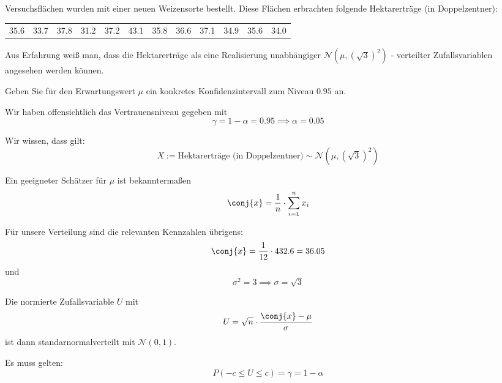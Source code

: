 \documentclass{abgabe}
\begin{document}
\begin{questions}
     Versuchsflächen wurden mit einer neuen Weizensorte bestellt.
    Diese Flächen erbrachten folgende Hektarerträge (in Doppelzentner):
    
    \begin{center}
        \begin{tabular}{cccccccccccc}
            35.6 & 33.7 & 37.8 & 31.2 & 37.2 & 43.1 & 35.8 & 36.6 & 37.1 & 34.9 & 35.6 & 34.0
        \end{tabular}
    \end{center}
    
    Aus Erfahrung weiß man, dass die Hektarerträge als eine Realisierung unabhängiger $\mathcal{N}(\mu, (\sqrt{3})^2)$ - verteilter Zufallsvariablen angesehen werden können. 
    
    Geben Sie für den Erwartungswert $\mu$ ein konkretes Konfidenzintervall zum Niveau $0.95$ an.
    
    \begin{solution}
        Wir haben offensichtlich das Vertrauensniveau gegeben mit 
        \[
            \gamma = 1 - \alpha = 0.95 \implies \alpha = 0.05    
        \]
        
        Wir wissen, dass gilt:
        \[ 
            X := \text{Hektarerträge (in Doppelzentner)} \sim \mathcal{N}(\mu, (\sqrt{3})^2)
        \]
        
        Ein geeigneter Schätzer für $\mu$ ist bekanntermaßen 
        \[
            \conj{x} = \frac{1}{n} \cdot \sum_{i=1}^{n} x_i    
        \]
        
        Für unsere Verteilung sind die relevanten Kennzahlen übrigens: 
        \[ 
            \conj{x} = \frac{1}{12} \cdot 432.6 = 36.05
        \]
        und 
        \[ 
            \sigma^2 = 3 \implies \sigma = \sqrt{3}
        \]
        
        Die normierte Zufallsvariable $U$ mit 
        \[ 
            U = \sqrt{n} \cdot \frac{\conj{x} - \mu}{\sigma}
        \]
        ist dann standarnormalverteilt mit $\mathcal{N}(0, 1)$.
        
        Es muss gelten: 
        \[
            P(-c \leq U \leq c) = \gamma = 1 - \alpha
        \]
        

\end{solution}
\end{questions}
\end{document}
